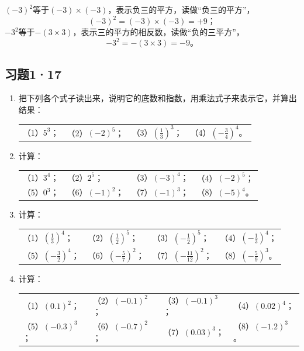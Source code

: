  \((-3)^2\)等于\((-3) \times (-3)\)，表示负三的平方，读做“负三的平方”，
\[
(-3)^2 = (-3) \times (-3) = +9；
\]
\(-3^2\)等于\(-(3 \times 3)\)，表示三的平方的相反数，读做“负的三平方”，
\[
-3^2 = -(3 \times 3) = -9。
\]

\subsection{习题1·17}

\begin{enumerate}
\item 把下列各个式子读出来，说明它的底数和指数，用乘法式子来表示它，并算出结果：
  \par\smallskip
  \begin{tabular}{@{}llll@{}}
  （1）\(5^3\)；\qquad & （2）\((-2)^5\)；\qquad & （3）\(\left(\frac{1}{3}\right)^3\)；\qquad & （4）\(\left(-\frac{3}{4}\right)^4\)。
  \end{tabular}

\item 计算：
  \par\smallskip
  \begin{tabular}{@{}llll@{}}
  （1）\(3^4\)；\qquad & （2）\(2^5\)；\qquad & （3）\((-3)^4\)；\qquad & （4）\((-2)^5\)； \\[4pt]
  （5）\(0^3\)； & （6）\((-1)^2\)； & （7）\((-1)^3\)； & （8）\((-5)^4\)。
  \end{tabular}

\item 计算：
  \par\smallskip
  \begin{tabular}{@{}llll@{}}
  （1）\(\left(\frac{1}{3}\right)^4\)；\qquad & （2）\(\left(\frac{1}{2}\right)^5\)；\qquad & （3）\(\left(-\frac{1}{2}\right)^5\)；\qquad & （4）\(\left(-\frac{1}{3}\right)^4\)； \\[8pt]
  （5）\(\left(-\frac{3}{2}\right)^4\)； & （6）\(\left(-\frac{5}{7}\right)^2\)； & （7）\(\left(-\frac{11}{12}\right)^2\)； & （8）\(\left(-\frac{5}{9}\right)^3\)。
  \end{tabular}

\item 计算：
  \par\smallskip
  \begin{tabular}{@{}llll@{}}
  （1）\((0.1)^2\)；\qquad & （2）\((-0.1)^2\)；\qquad & （3）\((-0.1)^3\)；\qquad & （4）\((0.02)^4\)； \\[4pt]
  （5）\((-0.3)^3\)； & （6）\((-0.7)^2\)； & （7）\((0.03)^3\)； & （8）\((-1.2)^3\)。
  \end{tabular}


\end{enumerate}
